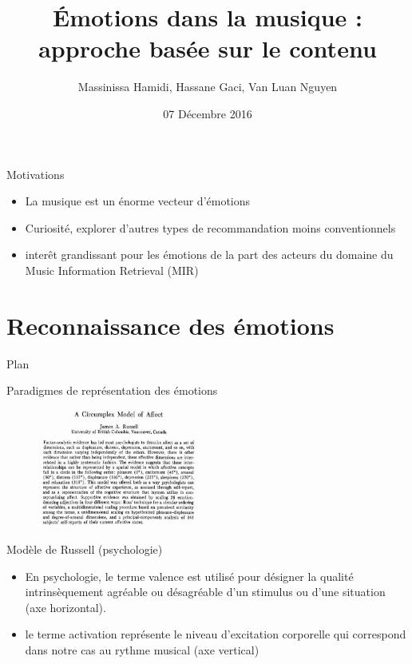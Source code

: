 \documentclass{beamer}
\title[emodiderot]{Émotions dans la musique :\\approche basée sur le contenu}
\author{Massinissa Hamidi, Hassane Gaci, Van Luan Nguyen}
\institute{Université Paris Diderot - Paris 7}
\date{07 Décembre 2016}
\begin{document}
\begin{frame} %
 \titlepage
\end{frame} %

\begin{frame}{Motivations}
    \begin{itemize}
        \item La musique est un énorme vecteur d'émotions
        \item Curiosité, explorer d'autres types de recommandation moins
            conventionnels
        \item interêt grandissant pour les émotions de la part des acteurs du
            domaine du Music Information Retrieval (MIR)
    \end{itemize}
\end{frame}

\section{Reconnaissance des émotions}

\begin{frame}{Plan}
      \tableofcontents[currentsection]
  \end{frame}

\begin{frame}{Paradigmes de représentation des émotions}
\begin{figure}
\centering
\includegraphics[width=200px]{images/a_circumplex_model_of_affect.png}
\end{figure}
\end{frame}
\begin{frame}{Modèle de Russell (psychologie)}
\begin{itemize}
    \item En psychologie, le terme valence est utilisé pour désigner la qualité
        intrinsèquement agréable ou désagréable d'un stimulus ou d'une
        situation (axe horizontal).

    \item le terme activation représente le niveau d'excitation corporelle qui
        correspond dans notre cas au rythme musical (axe vertical)
\end{itemize}

\end{frame}
\end{document}
